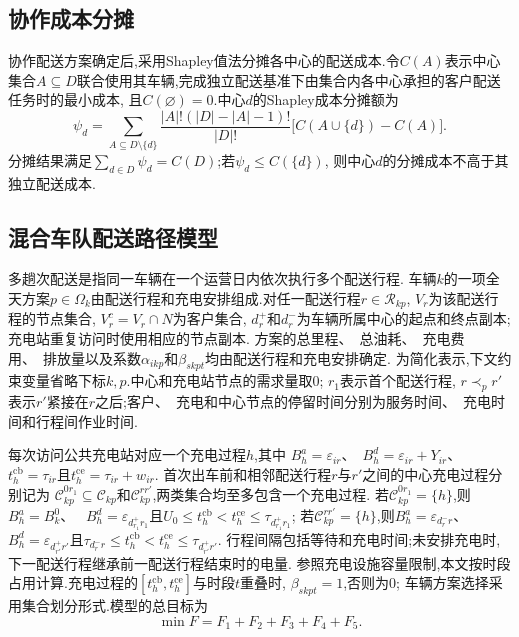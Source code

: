 \documentclass{setp-new}
\newcommand{\inlinecite}[1]{{\zihao{-5}\setcitestyle{numbers,square}\citep{#1}}}
\begin{document}
\subsection{协作成本分摊}

协作配送方案确定后,采用Shapley值法分摊各中心的配送成本.令$C(A)$表示中心集合$A\subseteq D$联合使用其车辆,完成独立配送基准下由集合内各中心承担的客户配送任务时的最小成本,
且$C(\varnothing)=0$.中心$d$的Shapley成本分摊额为\inlinecite{ref:91}
\begin{equation}
\psi_d=\sum_{A\subseteq D\setminus\{d\}}
\frac{|A|!(|D|-|A|-1)!}{|D|!}
\bigl[C(A\cup\{d\})-C(A)\bigr].
\label{eq:shapley-cost}
\end{equation}
分摊结果满足$\sum_{d\in D}\psi_d=C(D)$;若$\psi_d\le C(\{d\})$,
则中心$d$的分摊成本不高于其独立配送成本.

\subsection{混合车队配送路径模型}

多趟次配送是指同一车辆在一个运营日内依次执行多个配送行程\cite{ref:44}.
车辆$k$的一项全天方案$p\in\Omega_k$由配送行程和充电安排组成.对任一配送行程$r\in\mathcal R_{kp}$,
$V_r$为该配送行程的节点集合, $V_r^{c}=V_r\cap N$为客户集合, $d_r^{+}$和$d_r^{-}$为车辆所属中心的起点和终点副本;
充电站重复访问时使用相应的节点副本.
方案的总里程、~总油耗、~充电费用、~排放量以及系数$\alpha_{ikp}$和$\beta_{skpt}$均由配送行程和充电安排确定.
为简化表示,下文约束变量省略下标$k,p$.中心和充电站节点的需求量取0; $r_1$表示首个配送行程,
$r\prec_p r'$表示$r'$紧接在$r$之后;客户、~充电和中心节点的停留时间分别为服务时间、~充电时间和行程间作业时间.

每次访问公共充电站对应一个充电过程$h$,其中
$B_h^{a}=\varepsilon_{ir}$、~$B_h^{d}=\varepsilon_{ir}+Y_{ir}$、~
$t_h^{\mathrm{cb}}=\tau_{ir}$且$t_h^{\mathrm{ce}}=\tau_{ir}+w_{ir}$.
首次出车前和相邻配送行程$r$与$r'$之间的中心充电过程分别记为
$\mathcal C_{kp}^{0r_1}\subseteq\mathcal C_{kp}$和$\mathcal C_{kp}^{rr'}$,两类集合均至多包含一个充电过程.
若$\mathcal C_{kp}^{0r_1}=\{h\}$,则$B_h^{a}=B_k^{0}$、~
$B_h^{d}=\varepsilon_{d_{r_1}^{+}r_1}$且$U_0\le t_h^{\mathrm{cb}}<t_h^{\mathrm{ce}}\le\tau_{d_{r_1}^{+}r_1}$;
若$\mathcal C_{kp}^{rr'}=\{h\}$,则$B_h^{a}=\varepsilon_{d_r^{-}r}$、~
$B_h^{d}=\varepsilon_{d_{r'}^{+}r'}$且$\tau_{d_r^{-}r}\le t_h^{\mathrm{cb}}<t_h^{\mathrm{ce}}\le\tau_{d_{r'}^{+}r'}$.
行程间隔包括等待和充电时间;未安排充电时,下一配送行程继承前一配送行程结束时的电量.
参照充电设施容量限制\cite{ref:12},本文按时段占用计算.充电过程的$[t_h^{\mathrm{cb}},t_h^{\mathrm{ce}}]$与时段$t$重叠时, $\beta_{skpt}=1$,否则为0;
车辆方案选择采用集合划分形式\cite{ref:sahin}.模型的总目标为
\begin{equation}
\min F=F_1+F_2+F_3+F_4+F_5.
\label{eq:unified-objective}
\end{equation}
\end{document}
